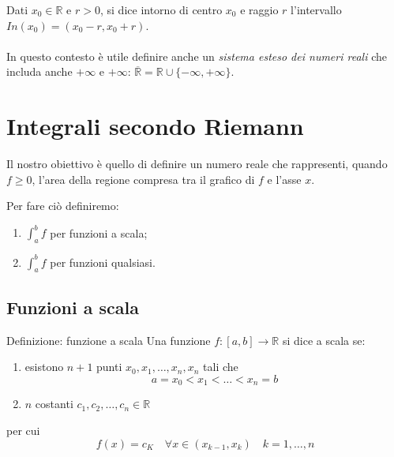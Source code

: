 \documentclass[x11names]{article}
\begin{document}
	\noindent
	Dati $x_0\in \mathbb{R} $ e $ r>0$, si dice intorno di centro $x_0$ e raggio $r$ l'intervallo $In(x_0) = (x_0 -r, x_0 +r)$.
	\\\\
	\noindent
	In questo contesto è utile definire anche un \textit{sistema esteso dei numeri reali} che includa anche $+\infty $ e $ +\infty$: $\overline{\mathbb{R}} = \mathbb{R} \cup \{ -\infty,+\infty \}$. 
	
	\newpage
	\section{Integrali secondo Riemann}
	Il nostro obiettivo è quello di definire un numero reale che rappresenti, quando $f \geq 0$, l'area della regione compresa tra il grafico di $f$ e l'asse $x$.
	
	
	\noindent
	Per fare ciò definiremo:
	\begin{enumerate}
		\item $\int_{a}^{b}f$ per funzioni a scala;
		\item $\int_{a}^{b}f$ per funzioni qualsiasi.
	\end{enumerate}
	
	\subsection{Funzioni a scala}
		\begin{center}
		\colorbox{myblue}{\begin{minipage}{5.75in}
				\begin{blues}{Definizione: funzione a scala}
					Una funzione $f: [a,b] \to \mathbb{R}$ si dice a scala se:
					\begin{enumerate}
						\item esistono $n+1$ punti $x_0,x_1, \dots, x_n, x_n$ tali che
						\[
						a = x_0 < x_1 < \dots < x_n =b
						\]
						\item $n$ costanti $c_1, c_2 , \dots , c_n \in \mathbb{R}$
					\end{enumerate}
					 per cui
					 \[
					 f(x) = c_K \quad \forall x \in (x_{k-1}, x_k) \quad k=1,\dots,n
					 \]
				\end{blues}
		\end{minipage}}       
	\end{center}
	
\end{document}
